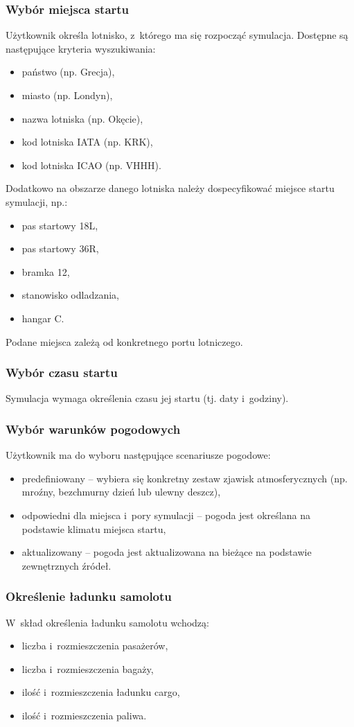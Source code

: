 \documentclass{mwrep}
\begin{document}
\subsubsection{Wybór miejsca startu}
Użytkownik określa lotnisko, z~którego ma się rozpocząć symulacja. Dostępne są następujące kryteria wyszukiwania:
\begin{itemize}
\item państwo (np. Grecja),
\item miasto (np. Londyn),
\item nazwa lotniska (np. Okęcie),
\item kod lotniska IATA (np. KRK),
\item kod lotniska ICAO (np. VHHH).
\end{itemize}
Dodatkowo na obszarze danego lotniska należy dospecyfikować miejsce startu symulacji, np.:
\begin{itemize}
\item pas startowy 18L,
\item pas startowy 36R,
\item bramka 12,
\item stanowisko odladzania,
\item hangar C.
\end{itemize}
Podane miejsca zależą od konkretnego portu lotniczego.

\subsubsection{Wybór czasu startu}
Symulacja wymaga określenia czasu jej startu (tj. daty i~godziny).

\subsubsection{Wybór warunków pogodowych}
Użytkownik ma do wyboru następujące scenariusze pogodowe:
\begin{itemize}
\item predefiniowany -- wybiera się konkretny zestaw zjawisk atmosferycznych (np. mroźny, bezchmurny dzień lub ulewny deszcz),
\item odpowiedni dla miejsca i~pory symulacji -- pogoda jest określana na podstawie klimatu miejsca startu,
\item aktualizowany -- pogoda jest aktualizowana na bieżące na podstawie zewnętrznych źródeł.
\end{itemize}

\subsubsection{Określenie ładunku samolotu}
W~skład określenia ładunku samolotu wchodzą:
\begin{itemize}
\item liczba i~rozmieszczenia pasażerów,
\item liczba i~rozmieszczenia bagaży,
\item ilość i~rozmieszczenia ładunku cargo,
\item ilość i~rozmieszczenia paliwa.
\end{itemize}
\end{document}
